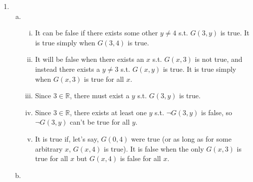 \begin{enumerate}
    \item\begin{enumerate}[(a)]
        \item\begin{enumerate}[(i)]
            \item {} It can be false if there exists some other $y\neq4$ s.t. $G(3, y)$ is true. It is true simply when $G(3, 4)$ is true.
            \item {} It will be false when there exists an $x$ s.t. $G(x,3)$ is not true, and instead there exists a $y\neq3$ s.t. $G(x,y)$ is true. It is true simply when $G(x,3)$ is true for all $x$.
            \item {} Since $3\in\mathbb{R}$, there must exist a $y$ s.t. $G(3,y)$ is true.
            \item {} Since $3\in\mathbb{R}$, there exists at least one $y$ s.t. $\neg G(3,y)$ is false, so $\neg G(3,y)$ can't be true for all $y$.
            \item {} It is true if, let's say, $G(0, 4)$ were true (or as long as for some arbitrary $x$, $G(x, 4)$ is true). It is false when the only $G(x, 3)$ is true for all $x$ but $G(x,4)$ is false for all $x$.
        \end{enumerate}
        \item {}
    \end{enumerate}
    

\end{enumerate}
